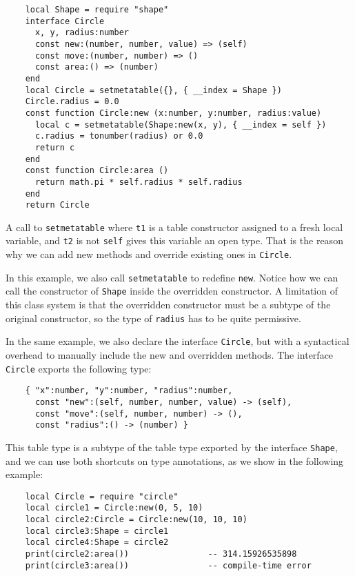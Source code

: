 \begin{verbatim}
    local Shape = require "shape"
    interface Circle
      x, y, radius:number
      const new:(number, number, value) => (self)
      const move:(number, number) => ()
      const area:() => (number)
    end
    local Circle = setmetatable({}, { __index = Shape })
    Circle.radius = 0.0
    const function Circle:new (x:number, y:number, radius:value)
      local c = setmetatable(Shape:new(x, y), { __index = self })
      c.radius = tonumber(radius) or 0.0
      return c
    end
    const function Circle:area ()
      return math.pi * self.radius * self.radius
    end
    return Circle
\end{verbatim}

A call to \texttt{setmetatable} where \texttt{t1} is a table
constructor assigned to a fresh local variable, and \texttt{t2}
is not \texttt{self} gives this variable an open type.
That is the reason why we can add new methods and override
existing ones in \texttt{Circle}.

In this example, we also call \texttt{setmetatable} to redefine \texttt{new}.
Notice how we can call the constructor of \texttt{Shape} inside
the overridden constructor.
A limitation of this class system is that the overridden constructor
must be a subtype of the original constructor,
so the type of \texttt{radius} has to be quite permissive.

In the same example, we also declare the interface \texttt{Circle},
but with a syntactical overhead to manually include the new and
overridden methods.
The interface \texttt{Circle} exports the following type:
\begin{verbatim}
    { "x":number, "y":number, "radius":number,
      const "new":(self, number, number, value) -> (self),
      const "move":(self, number, number) -> (),
      const "radius":() -> (number) }
\end{verbatim}

This table type is a subtype of the table type exported by the interface \texttt{Shape},
and we can use both shortcuts on type annotations, as we show in the following example:
\begin{verbatim}
    local Circle = require "circle"
    local circle1 = Circle:new(0, 5, 10)
    local circle2:Circle = Circle:new(10, 10, 10)
    local circle3:Shape = circle1
    local circle4:Shape = circle2
    print(circle2:area())                -- 314.15926535898
    print(circle3:area())                -- compile-time error
\end{verbatim}

